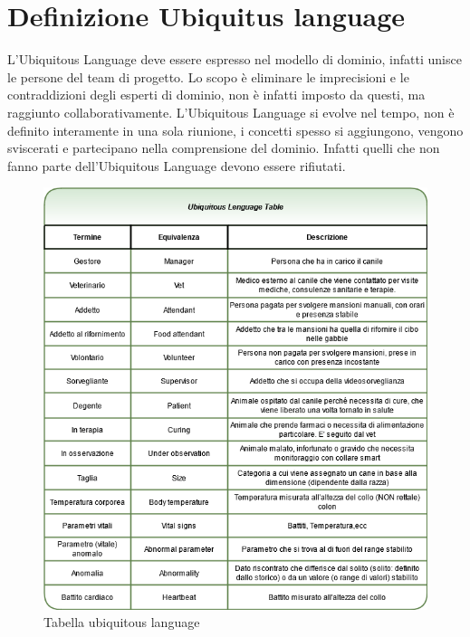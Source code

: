 	\section{Definizione Ubiquitus language}	
	L'Ubiquitous Language deve essere espresso nel modello di dominio, infatti unisce le persone del team di progetto.
    Lo scopo è eliminare le imprecisioni e le contraddizioni degli esperti di dominio, non è infatti imposto da questi, ma raggiunto collaborativamente.
    L'Ubiquitous Language si evolve nel tempo, non è definito interamente in una sola riunione, i concetti spesso si aggiungono, vengono sviscerati e partecipano nella comprensione del dominio. Infatti quelli che non fanno parte dell'Ubiquitous Language devono essere rifiutati.
    
    \begin{figure}[ht]
        \caption{Tabella ubiquitous language}
        \centering
        \includegraphics[width=1\textwidth]{DrawIo/ubiquitousLanguage.png}
    \end{figure}
